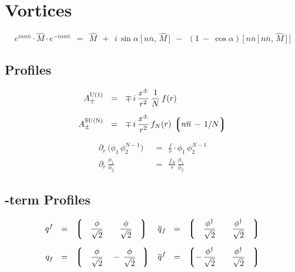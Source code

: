 \documentclass[14pt]{article}
\newcommand{\p}{\partial}
\newcommand{\ov}{\overline}
\newcommand{\lgr}{\left\lgroup}
\newcommand{\rgr}{\right\rgroup}
\newcommand{\nnbar}{n\ov{n}}
\begin{document}
\pagebreak
\section*{\centering Vortices}

\begin{equation*}
e^{i \alpha \nnbar} \cdot \hat{M} \cdot e^{- i \alpha \nnbar}    ~~=~~
\hat{M}  ~~+~~  i\, \sin \alpha \: \big[\, \nnbar,\, \hat{M} \,\big]
~~-~~  ( 1 ~-~ \cos \alpha )\, \big[\, \nnbar\, \big[\, \nnbar,\, \hat{M} \,\big] \,\big]
\end{equation*}


\vspace{2mm}
\subsection*{\centering Profiles}

\begin{align*}
%
	A_\pm^\text{U(1)}    & ~~=~~    \mp\, i\, \frac{x^\pm}{r^2}\, \frac{1}{N}\, f(r)
	\\[2mm]
%
	A_\pm^\text{SU(N)}    & ~~=~~    \mp\, i\, \frac{x^\pm}{r^2}\, f_N(r)\, \lgr \nnbar \,-\, 1/N \rgr
\end{align*}

\begin{align*}
%
	\p_r\, \big( \phi_1\, \phi_2^{N-1} \big)    & ~~=~~    \frac{f}{r} \cdot \phi_1\, \phi_2^{N-1}
	\\[2mm]
%
	\p_r\, \frac{\phi_1}{\phi_2}    & ~~=~~    \frac{f_N}{r}\, \frac{\phi_1}{\phi_2}
\end{align*}


\vspace{2mm}
\subsection*{\centering {}-term Profiles}

\begin{align*}
%
	q^f    & ~~=~~    \lgr \phantom{+\,}\frac \phi {\sqrt 2}~~~	\phantom{+\,}\frac \phi {\sqrt 2} \phantom{\,+} \rgr
	&
	\ov q{}_f    & ~~=~~    \lgr \phantom{+\,}\frac{\phi^\dag}{\sqrt 2}~~~ \phantom{+\,}\frac{\phi^\dag}{\sqrt 2} \phantom{\,+} \rgr
	\\[2mm]
%
	q_f    & ~~=~~    \lgr \phantom{+\,}\frac \phi {\sqrt 2}~~~ -\,\frac \phi {\sqrt 2} \phantom{+} \rgr
	&
	\ov q{}^f    & ~~=~~    \lgr -\,\frac{\phi^\dag}{\sqrt 2}~~~ \phantom{+\,}\frac{\phi^\dag}{\sqrt 2} \phantom{\,+} \rgr
\end{align*}
\end{document}
